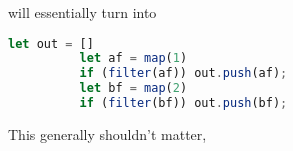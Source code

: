 \documentclass{article}
\begin{document}
\begin{enumerate}
        will essentially turn into 

        \begin{lstlisting}[language=JavaScript]
          let out = []
          let af = map(1)
          if (filter(af)) out.push(af);
          let bf = map(2)
          if (filter(bf)) out.push(bf);
        \end{lstlisting}                

        This generally shouldn't matter,      
    \end{enumerate}    
\end{document}
